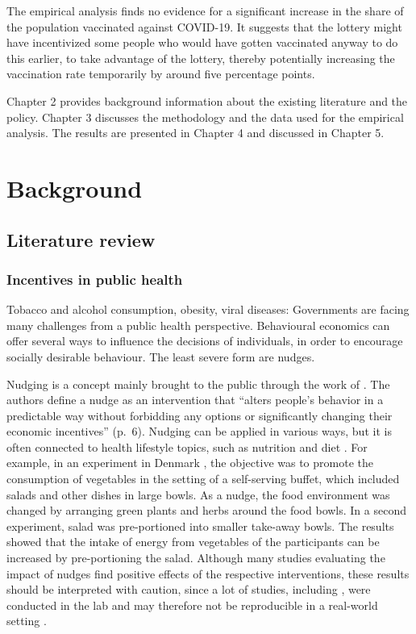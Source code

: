 \documentclass{scrbook}
\begin{document}
The empirical analysis finds no evidence for a significant increase in
the share of the population vaccinated against COVID-19. It suggests
that the lottery might have incentivized some people who would have
gotten vaccinated anyway to do this earlier, to take advantage of the
lottery, thereby potentially increasing the vaccination rate temporarily
by around five percentage points.

Chapter 2 provides background information about the existing literature
and the policy. Chapter 3 discusses the methodology and the data used
for the empirical analysis. The results are presented in Chapter 4 and
discussed in Chapter 5.

\chapter{Background}

\section{Literature review}

\subsection*{Incentives in public health}

Tobacco and alcohol consumption, obesity, viral diseases: Governments
are facing many challenges from a public health perspective. Behavioural
economics can offer several ways to influence the decisions of
individuals, in order to encourage socially desirable behaviour. The
least severe form are nudges.

Nudging is a concept mainly brought to the public through the work of
\textcite{thaler_nudge_2008}. The authors define a nudge as an
intervention that ``alters people's behavior in a predictable way
without forbidding any options or significantly changing their economic
incentives'' (p.~6). Nudging can be applied in various ways, but it is
often connected to health lifestyle topics, such as nutrition and diet
\parencite{ledderer_nudging_2020}. For example, in an experiment in
Denmark \parencite{friis_comparison_2017}, the objective was to promote
the consumption of vegetables in the setting of a self-serving buffet,
which included salads and other dishes in large bowls. As a nudge, the
food environment was changed by arranging green plants and herbs around
the food bowls. In a second experiment, salad was pre-portioned into
smaller take-away bowls. The results showed that the intake of energy
from vegetables of the participants can be increased by pre-portioning
the salad. Although many studies evaluating the impact of nudges find
positive effects of the respective interventions, these results should
be interpreted with caution, since a lot of studies, including
\textcite{friis_comparison_2017}, were conducted in the lab and may
therefore not be reproducible in a real-world setting
\parencite{ledderer_nudging_2020}.
\end{document}
